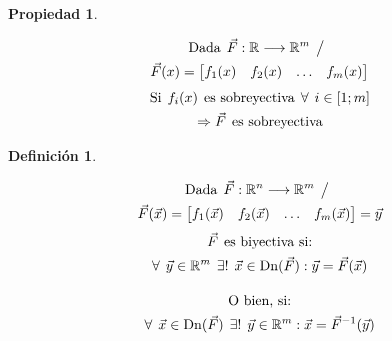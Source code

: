 \documentclass[a5paper,12pt,twoside]{book}
\newtheorem{defn}{{Definición}}[chapter]
\newtheorem{prop}{{Propiedad}}[chapter]
\begin{document}
\begin{mdframed}[style=MyFrame1]
    \begin{prop}
    \end{prop}
    \begin{multline*}
        \textrm{Dada} \hspace{1ex} \Vec{F}: \mathbb{R} \longrightarrow \mathbb{R}^m \hspace{1ex} \big/ \hspace{1ex}
        \\
        \Vec{F}(x) = \begin{bmatrix} f_1(x) & f_2(x) & \ldots & f_m(x) \end{bmatrix}
    \end{multline*}
    \begin{gather*}
        \textrm{Si} \hspace{1ex} f_i(x) \hspace{1ex} \textrm{es sobreyectiva} \hspace{1ex} \forall \hspace{1ex} i \in [1;m]
        \\
        \Rightarrow \Vec{F} \hspace{1ex} \textrm{es sobreyectiva}
    \end{gather*}
\end{mdframed}

\begin{mdframed}[style=MyFrame1]
    \begin{defn}
    \end{defn}
    \begin{multline*}
        \textrm{Dada} \hspace{1ex} \Vec{F}: \mathbb{R}^n \longrightarrow \mathbb{R}^m \hspace{1ex} \big/ \hspace{1ex}
        \\
        \Vec{F}(\Vec{x}) = \begin{bmatrix} f_1(\Vec{x}) & f_2(\Vec{x}) & \ldots & f_m(\Vec{x}) \end{bmatrix} = \Vec{y}
    \end{multline*}
    \begin{gather*}
        \Vec{F} \hspace{1ex} \textrm{es biyectiva si:}
        \\
        \forall \hspace{1ex} \Vec{y} \in \mathbb{R}^m \hspace{1ex} \exists ! \hspace{1ex} \Vec{x} \in \operatorname{Dn}(\Vec{F}): \Vec{y} = \Vec{F}(\Vec{x})
        \\[1em]
        \textrm{O bien, si:}
        \\
        \forall \hspace{1ex} \Vec{x} \in \operatorname{Dn}(\Vec{F}) \hspace{1ex} \exists ! \hspace{1ex} \Vec{y} \in \mathbb{R}^m : \Vec{x} = \Vec{F}^{-1}(\Vec{y})
    \end{gather*}
\end{mdframed}
\end{document}
